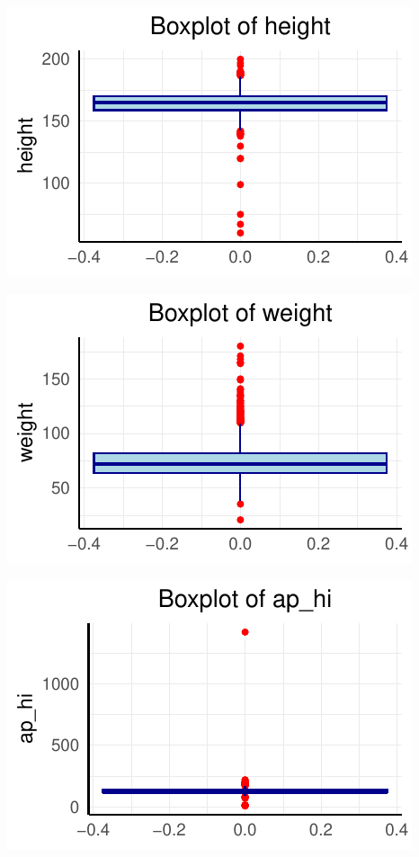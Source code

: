 \documentclass[
  letterpaper,
  DIV=11,
  numbers=noendperiod]{scrartcl}
\begin{document}
\begin{center}
\includegraphics{home_work_test_files/figure-pdf/unnamed-chunk-3-2.pdf}
\end{center}

\begin{center}
\includegraphics{home_work_test_files/figure-pdf/unnamed-chunk-3-3.pdf}
\end{center}

\begin{center}
\includegraphics{home_work_test_files/figure-pdf/unnamed-chunk-3-4.pdf}
\end{center}
\end{document}
